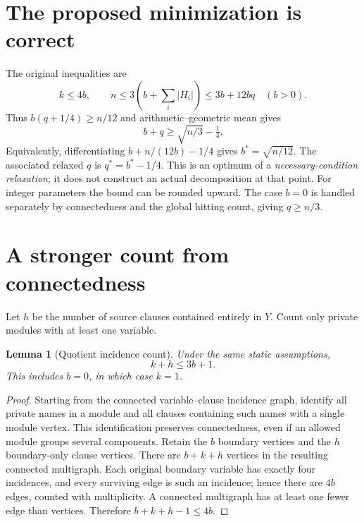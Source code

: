 \documentclass[11pt]{article}
\newtheorem{lemma}[theorem]{Lemma}
\begin{document}
\section{The proposed minimization is correct}
The original inequalities are
\[
 k\le4b,\qquad n\le3\left(b+\sum_i|H_i|\right)\le3b+12bq
 \quad (b>0).
\]
Thus $b(q+1/4)\ge n/12$ and arithmetic--geometric mean gives
\[
 \boxed{b+q\ge\sqrt{n/3}-\tfrac14.}
\]
Equivalently, differentiating $b+n/(12b)-1/4$ gives $b^*=\sqrt{n/12}$. The associated relaxed $q$ is $q^*=b^*-1/4$. This is an optimum of a \emph{necessary-condition relaxation}; it does not construct an actual decomposition at that point. For integer parameters the bound can be rounded upward. The case $b=0$ is handled separately by connectedness and the global hitting count, giving $q\ge n/3$.

\section{A stronger count from connectedness}
Let $h$ be the number of source clauses contained entirely in $Y$. Count only private modules with at least one variable.
\begin{lemma}[Quotient incidence count]
Under the same static assumptions,
\[
 \boxed{k+h\le3b+1.}
\]
This includes $b=0$, in which case $k=1$.
\end{lemma}
\begin{proof}
Starting from the connected variable--clause incidence graph, identify all private names in a module and all clauses containing such names with a single module vertex. This identification preserves connectedness, even if an allowed module groups several components. Retain the $b$ boundary vertices and the $h$ boundary-only clause vertices. There are $b+k+h$ vertices in the resulting connected multigraph. Each original boundary variable has exactly four incidences, and every surviving edge is such an incidence; hence there are $4b$ edges, counted with multiplicity. A connected multigraph has at least one fewer edge than vertices. Therefore $b+k+h-1\le4b$.
\end{proof}
\end{document}
